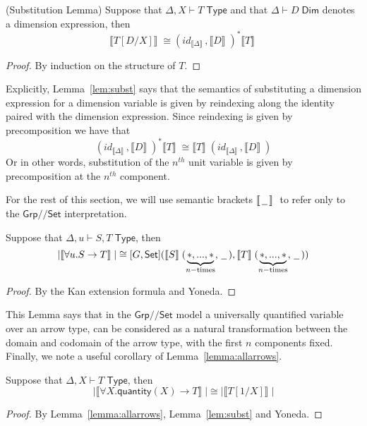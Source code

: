 \documentclass[a4paper,UKenglish]{lipics}
\newcommand{\msf}[1]{\mathsf{#1}} %
\newcommand{\Grp}{\msf{Grp}}
\newcommand{\Set}{\msf{Set}}
\newcommand{\blank}{\, \underline{\hspace{2mm}} \,}
\newcommand{\GroupSet}[1]{[#1,\Set]}
\newcommand{\Lslice}[1]{#1/\!/\Set}
\newcommand{\GrpSet}{\Lslice{\Grp}}
\newcommand{\sem}[1]{\ensuremath{\llbracket #1 \rrbracket} \;}
\newcommand{\qnt}{\msf{quantity}}
\newcommand{\Dj}[2]{#1 \vdash #2 \; \msf{ Dim}}
\newcommand{\Dim}{D}
\begin{document}
\begin{lemma}(Substitution Lemma)
\label{lem:subst}
Suppose that $\Delta, X \vdash T \; \msf{ Type}$ and that $\Dj\Delta \Dim$ denotes a dimension expression, then
\[
 \sem{T[D/X]} \cong (id_{\sem{\Delta}} , \sem{D})^\ast \sem{T}
\]
\end{lemma}
\begin{proof}
 By induction on the structure of $T$.
\end{proof}


Explicitly, Lemma~\ref{lem:subst} says that the semantics of substituting a dimension expression for a dimension variable is given by reindexing along the identity paired with the dimension expression. Since reindexing is given by precomposition we have that
\[
 (id_{\sem{\Delta}} , \sem{D})^\ast \sem{T} \cong \sem{T}(id_{\sem{\Delta}}, \sem{D})
\]
Or in other words, substitution of the $n^{th}$ unit variable is given by precomposition at the $n^{th}$ component.

For the rest of this section, we will use semantic brackets $\sem{\, \underline{\hspace{2mm}}\, }$ to refer only to the $\GrpSet$ interpretation.

\begin{lemma}
\label{lemma:allarrows}
 Suppose that $\Delta, u \vdash S,T \; \msf{ Type}$, then
\[
|\sem{\forall u. S \rightarrow T}| \cong \GroupSet{G} (\sem{S}(\underbrace{\ast,...,\ast}_{n-\text{times}}, \blank),\sem{T}(\underbrace{\ast,...,\ast}_{n-\text{times}}, \blank))
\]
\end{lemma}
\begin{proof}
By the Kan extension formula and Yoneda.
\end{proof}

This Lemma says that in the $\GrpSet$ model a universally quantified variable over an arrow type, can be considered as a natural transformation between the domain and codomain of the arrow type, with the first $n$ components fixed. Finally, we note a useful corollary of Lemma~\ref{lemma:allarrows}.
\begin{corollary}
\label{cor:subs}
Suppose that $\Delta, X \vdash T \; \msf{ Type}$, then
 \[
  |\sem{\forall X . \qnt(X) \rightarrow T}| \cong |\sem{T[1/X]}|
\]
\end{corollary}
\begin{proof}
 By Lemma~\ref{lemma:allarrows}, Lemma~\ref{lem:subst} and Yoneda.
\end{proof}
\end{document}

